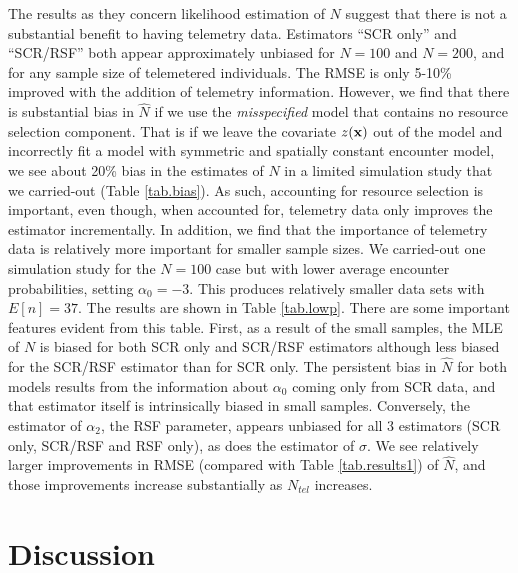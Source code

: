 \documentclass[12pt]{article}
\begin{document}
The results as they concern likelihood estimation of $N$ suggest that
there is not a substantial benefit to having telemetry
data. Estimators ``SCR only'' and ``SCR/RSF'' both appear
approximately unbiased for $N=100$ and $N=200$, and for any sample
size of telemetered individuals. The RMSE is only 5-10\% improved with
the addition of telemetry information.  However, we find that there is
substantial bias in $\hat{N}$ if we use the {\it misspecified} model
that contains no resource selection component. That is if we leave the
covariate $z({\bf x})$ out of the model and incorrectly fit a model
with symmetric and spatially constant encounter model, we see about
20\% bias in the estimates of $N$ in a limited simulation study that
we carried-out (Table \ref{tab.bias}). As such, accounting for resource
selection is important, even though, when accounted for, telemetry
data only improves the estimator incrementally.
In addition, we find that the importance of telemetry data is
relatively more important for smaller sample sizes. We carried-out one
simulation study for the $N=100$ case but with lower average encounter
probabilities, setting $\alpha_{0}=-3$. This produces
relatively smaller data sets with  $E[n] = 37$. The results are shown
in Table \ref{tab.lowp}. There are some important features evident from
this table. First, as a result of the small samples, the MLE of $N$ is
biased for both SCR only and SCR/RSF estimators although less biased
for the SCR/RSF estimator than for SCR only. The persistent bias in
$\hat{N}$ for both models results from the information about
$\alpha_{0}$ coming only from SCR data, and that estimator itself is
intrinsically biased in small samples.  Conversely, the estimator of
$\alpha_{2}$, the RSF parameter, appears unbiased for all 3 estimators
(SCR only, SCR/RSF and RSF only), as does the estimator of $\sigma$.
We see relatively larger improvements in RMSE (compared with Table
\ref{tab.results1}) of $\hat{N}$, and those improvements
increase substantially as $N_{tel}$ increases.









\section{Discussion}
\end{document}
